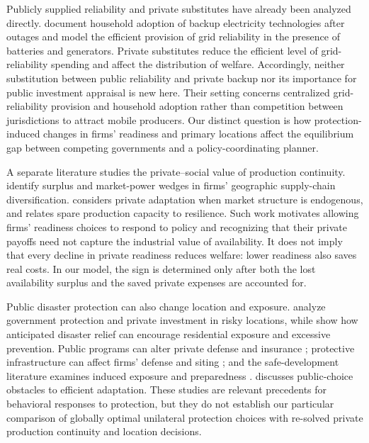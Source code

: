 Publicly supplied reliability and private substitutes have already been analyzed directly. \citet{BrehmJohnstonMilton2024} document household adoption of backup electricity technologies after outages and model the efficient provision of grid reliability in the presence of batteries and generators. Private substitutes reduce the efficient level of grid-reliability spending and affect the distribution of welfare. Accordingly, neither substitution between public reliability and private backup nor its importance for public investment appraisal is new here. Their setting concerns centralized grid-reliability provision and household adoption rather than competition between jurisdictions to attract mobile producers. Our distinct question is how protection-induced changes in firms' readiness and primary locations affect the equilibrium gap between competing governments and a policy-coordinating planner.

A separate literature studies the private--social value of production continuity. \citet{GrossmanHelpmanLhuillier2023} identify surplus and market-power wedges in firms' geographic supply-chain diversification. \citet{Eisenack2014} considers private adaptation when market structure is endogenous, and \citet{GnutzmannEtAl2020} relates spare production capacity to resilience. Such work motivates allowing firms' readiness choices to respond to policy and recognizing that their private payoffs need not capture the industrial value of availability. It does not imply that every decline in private readiness reduces welfare: lower readiness also saves real costs. In our model, the sign is determined only after both the lost availability surplus and the saved private expenses are accounted for.

Public disaster protection can also change location and exposure. \citet{KouskyLuttmerZeckhauser2006} analyze government protection and private investment in risky locations, while \citet{SeshimoYamazaki2018} show how anticipated disaster relief can encourage residential exposure and excessive prevention. Public programs can alter private defense and insurance \citep{MahmudBarbier2016}; protective infrastructure can affect firms' defense and siting \citep{GramesEtAl2019}; and the safe-development literature examines induced exposure and preparedness \citep{HaerEtAl2020,FusinatoEtAl2024}. \citet{GawelEtAl2018} discusses public-choice obstacles to efficient adaptation. These studies are relevant precedents for behavioral responses to protection, but they do not establish our particular comparison of globally optimal unilateral protection choices with re-solved private production continuity and location decisions.

